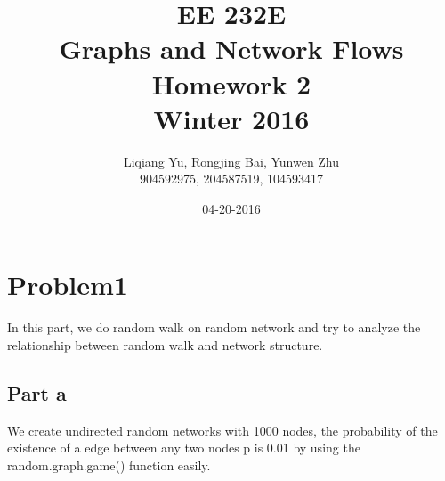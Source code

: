 \documentclass{article}
\begin{document}
\begin{titlepage}
\title{EE 232E \\Graphs and Network Flows\\Homework 2\\Winter 2016} 
\author{Liqiang Yu, Rongjing Bai, Yunwen Zhu\\
904592975, 204587519, 104593417}  %
\date{04-20-2016}
\end{titlepage}

\maketitle
\newpage
\tableofcontents
\newpage

\section{Problem1}\label{prob:p1}
In this part, we do random walk on random network and try to analyze the relationship between random walk and network structure.
\subsection{Part a}
We create undirected random networks with 1000 nodes, the probability of the existence of a edge between any two nodes p is 0.01 by using the random.graph.game() function easily.
\end{document}
